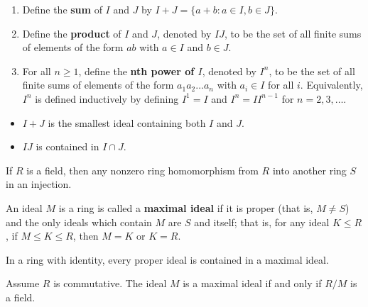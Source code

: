 \begin{definition}
    \begin{enumerate}
        \item[(1)] Define the \textbf{sum} of \( I  \) and \( J  \) by \( I + J  = \{  a + b : a \in I , b \in J  \}  \).
        \item[(2)] Define the \textbf{product} of \( I  \) and \( J  \), denoted by \( IJ  \), to be the set of all finite sums of elements of the form \( ab  \) with \( a \in I  \) and  \( b \in J  \). 
        \item[(3)] For all \( n \geq 1   \), define the \textbf{nth power of \( I  \)}, denoted by \( I^{n} \), to be the set of all finite sums of elements of the form \( {a}_{1}{a}_{2} \dots {a}_{n} \) with \( {a}_{i} \in I  \) for all \( i  \). Equivalently, \( I^{n} \) is defined inductively by defining \( I^{1} = I \) and \( I^{n} = I I^{n-1} \) for \( n = 2,3,\dots \).
    \end{enumerate}
\end{definition}

\begin{itemize}
    \item \( I + J  \) is the smallest ideal containing both \( I  \) and \( J  \).
    \item \( IJ \) is contained in \( I \cap J \).
\end{itemize}

\begin{corollary}
    If \( R  \) is a field, then any nonzero ring homomorphism from \( R  \) into another ring \( S  \) in an injection.
\end{corollary}

\begin{definition}
    An ideal \( M  \) is a ring is called a \textbf{maximal ideal} if it is proper (that is, \( M \neq S  \)) and the only ideals which contain \( M  \) are \( S  \) and itself; that is, for any ideal \( K \leq R  \), if \( M \leq K \leq R  \), then \( M = K  \) or \( K = R  \).
\end{definition}

\begin{prop}
    In a ring with identity, every proper ideal is contained in a maximal ideal.
\end{prop}

\begin{prop}
    Assume \( R  \) is commutative. The ideal \( M  \) is a maximal ideal if and only if \( R / M \) is a field.
\end{prop}

